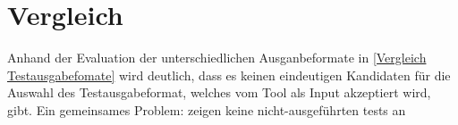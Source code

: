 
\section{Vergleich}
Anhand der Evaluation der unterschiedlichen Ausganbeformate in \ref{Vergleich Testausgabefomate} wird deutlich, dass es keinen eindeutigen Kandidaten für die Auswahl des Testausgabeformat, welches vom Tool als Input akzeptiert wird, gibt. Ein gemeinsames Problem: zeigen keine nicht-ausgeführten tests an
